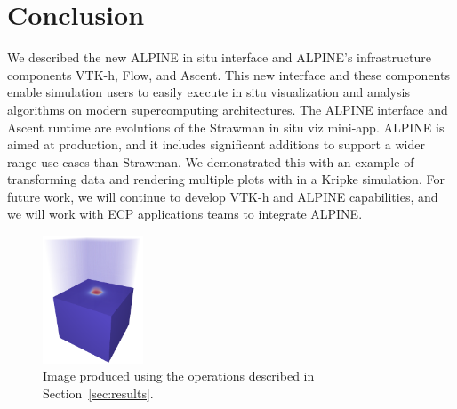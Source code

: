 \documentclass[sigconf]{acmart}
\begin{document}


\maketitle







\section{Conclusion}

We described the new ALPINE in situ interface and ALPINE's infrastructure components VTK-h, Flow, and Ascent.
%
This new interface and these components enable simulation users to easily execute in situ visualization and analysis algorithms
on modern supercomputing architectures. 
%
The ALPINE interface and Ascent runtime are evolutions of the Strawman in situ viz mini-app. ALPINE is aimed at production, and it includes significant additions to support a wider range use cases than Strawman. We demonstrated this with an example of transforming data and rendering multiple plots with in a Kripke simulation. 
%
%
%
For future work, we will continue to develop VTK-h and ALPINE capabilities, and we will work with ECP applications teams to integrate ALPINE.
 
\begin{figure}
	\includegraphics[width=3cm]{images/kripke}
	\caption{\label{kripke}Image produced using the operations described in Section~\ref{sec:results}.}
\end{figure}





 
\end{document}
